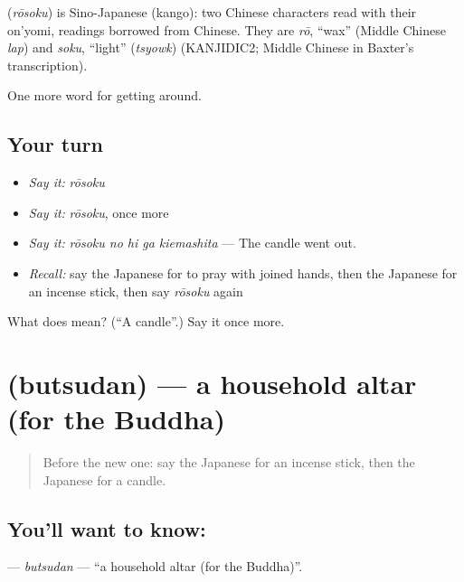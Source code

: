 \begin{cousinweb}
\textbf{} (\emph{rōsoku}) is Sino-Japanese (kango): two Chinese characters read with their on'yomi, readings borrowed from Chinese. They are \emph{rō}, \textquotedblleft{}wax\textquotedblright{} (Middle Chinese \emph{lap}) and \emph{soku}, \textquotedblleft{}light\textquotedblright{} (\emph{tsyowk}) (KANJIDIC2; Middle Chinese in Baxter's transcription).
\end{cousinweb}

\begin{grammarlens}[title={What you've built}]
One more word for getting around.
\end{grammarlens}

\subsection*{Your turn}
\begin{itemize}
\raggedright
  \item \emph{Say it:} \emph{rōsoku}
  \item \emph{Say it:} \emph{rōsoku}, once more
  \item \emph{Say it:} \emph{rōsoku no hi ga kiemashita} — The candle went out.
  \item \emph{Recall:} say the Japanese for to pray with joined hands, then the Japanese for an incense stick, then say \emph{rōsoku} again
\end{itemize}

\begin{tcolorbox}[breakable,colback=teal!4,colframe=teal!35!black,title={Before you move on}]
What does  mean? (\textquotedblleft{}A candle\textquotedblright{}.) Say it once more.
\end{tcolorbox}
\section[\texorpdfstring{\ja{ぶつだん} (butsudan)}{ぶつだん (butsudan)}]{ (butsudan) — a household altar (for the Buddha)}

\label{lesson:JA-C408-butsudan}



\begin{quote}
Before the new one: say the Japanese for an incense stick, then the Japanese for a candle.
\end{quote}

\subsection*{You'll want to know: }
\textbf{} — \emph{butsudan} — \textquotedblleft{}a household altar (for the Buddha)\textquotedblright{}.

